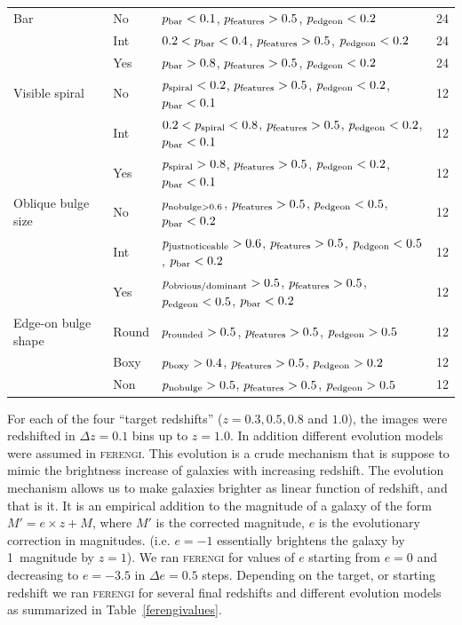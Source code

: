 \documentclass[usenatbib]{mn2e}
\newcommand{\ferengi}{\textsc{ferengi}}
\begin{document}
\begin{table}
\begin{tabular}{lllc}
Bar                 & No    & $p_{\rm bar} < 0.1$, $p_{\rm features} > 0.5$, $p_{\rm edgeon} < 0.2$                                 & 24 \\
                    & Int   & $0.2 < p_{\rm bar} < 0.4$, $p_{\rm features} > 0.5$, $p_{\rm edgeon} < 0.2$                           & 24 \\
                    & Yes   & $p_{\rm bar} > 0.8$, $p_{\rm features} > 0.5$, $p_{\rm edgeon} < 0.2$                                 & 24 \\
Visible spiral      & No    & $p_{\rm spiral} < 0.2$, $p_{\rm features} > 0.5$, $p_{\rm edgeon} < 0.2$, $p_{\rm bar} < 0.1$         & 12 \\
                    & Int   & $0.2 < p_{\rm spiral} < 0.8$, $p_{\rm features} > 0.5$, $p_{\rm edgeon} < 0.2$, $p_{\rm bar} < 0.1$   & 12 \\
                    & Yes   & $p_{\rm spiral} > 0.8$, $p_{\rm features} > 0.5$, $p_{\rm edgeon} < 0.2$, $p_{\rm bar} < 0.1$         & 12 \\
Oblique bulge size  & No    & $p_{\rm nobulge>0.6}$, $p_{\rm features} > 0.5$, $p_{\rm edgeon} < 0.5$, $p_{\rm bar} < 0.2$          & 12 \\
                    & Int   & $p_{\rm justnoticeable}>0.6$, $p_{\rm features} > 0.5$, $p_{\rm edgeon} < 0.5$, $p_{\rm bar} < 0.2$   & 12 \\
                    & Yes   & $p_{\rm obvious/dominant}>0.5$, $p_{\rm features} > 0.5$, $p_{\rm edgeon} < 0.5$, $p_{\rm bar} < 0.2$ & 12 \\
Edge-on bulge shape & Round & $p_{\rm rounded}>0.5$, $p_{\rm features} > 0.5$, $p_{\rm edgeon} > 0.5$                               & 12 \\
                    & Boxy  & $p_{\rm boxy}>0.4$, $p_{\rm features} > 0.5$, $p_{\rm edgeon} > 0.2$                                  & 12 \\
                    & Non   & $p_{\rm nobulge}>0.5$, $p_{\rm features} > 0.5$, $p_{\rm edgeon} > 0.5$                               & 12 \\
\hline\hline
\end{tabular}
\end{table}

For each of the four ``target redshifts'' ($z = 0.3, 0.5, 0.8$ and $1.0$), the images were redshifted in $\Delta z = 0.1$ bins up to $z=1.0$. In addition different evolution models were assumed in \ferengi{}. This evolution is a crude mechanism that is suppose to mimic the brightness increase of galaxies with increasing redshift. The evolution mechanism allows us to make galaxies brighter as linear function of redshift, and that is it. It is an empirical addition to the magnitude of a galaxy of the form $M' = e\times z + M$, where $M'$ is the corrected magnitude, $e$ is the evolutionary correction in magnitudes.  (i.e. $e=-1$ essentially brightens the galaxy by 1~magnitude by $z=1$). We ran \ferengi{} for values of $e$ starting from $e=0$ and decreasing to $e=-3.5$ in $\Delta e = 0.5$ steps. Depending on the target, or starting redshift we ran \ferengi{} for several final redshifts and different evolution models as summarized in Table~\ref{ferengivalues}. 
\end{document}
